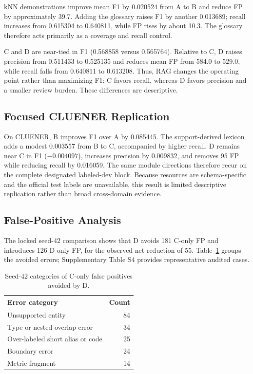kNN demonstrations improve mean F1 by 0.020524 from A to B and reduce FP by
approximately 39.7. Adding the glossary raises F1 by another 0.013689; recall
increases from 0.615304 to 0.640811, while FP rises by about 10.3. The glossary
therefore acts primarily as a coverage and recall control.

C and D are near-tied in F1 (0.568858 versus 0.565764). Relative to C, D raises
precision from 0.511433 to 0.525135 and reduces mean FP from 584.0 to 529.0,
while recall falls from 0.640811 to 0.613208. Thus, RAG changes the operating
point rather than maximizing F1: C favors recall, whereas D favors precision
and a smaller review burden. These differences are descriptive.

\subsection{Focused CLUENER Replication}

On CLUENER, B improves F1 over A by 0.085445. The support-derived lexicon adds
a modest 0.003557 from B to C, accompanied by higher recall. D remains near C
in F1 ($-0.004097$), increases precision by 0.009832, and removes 95 FP while
reducing recall by 0.016059. The same module directions therefore recur on the
complete designated labeled-dev block. Because resources are schema-specific
and the official test labels are unavailable, this result is limited
descriptive replication rather than broad cross-domain evidence.

\subsection{False-Positive Analysis}

The locked seed-42 comparison shows that D avoids 181 C-only FP and introduces
126 D-only FP, for the observed net reduction of 55. Table~\ref{tab:fp-categories}
groups the avoided errors; Supplementary Table S4 provides representative
audited cases.

\begin{table}[ht]
\caption{Seed-42 categories of C-only false positives avoided by D.}
\label{tab:fp-categories}
\centering
\begin{tabular}{lr}
\toprule
Error category & Count \\
\midrule
Unsupported entity & 84 \\
Type or nested-overlap error & 34 \\
Over-labeled short alias or code & 25 \\
Boundary error & 24 \\
Metric fragment & 14 \\
\bottomrule
\end{tabular}
\end{table}

